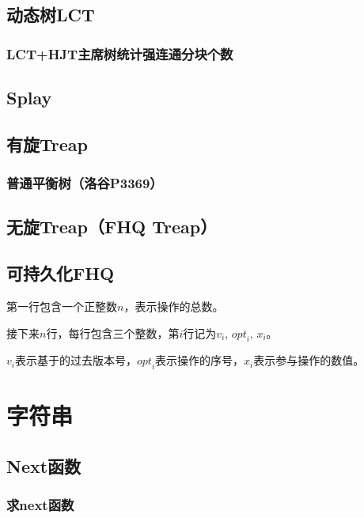 \documentclass{article}
\begin{document}
\subsection{动态树LCT}
\subsubsection{}
\subsubsection{LCT+HJT主席树统计强连通分块个数}



\subsection{Splay}
\subsection{有旋Treap}
\subsubsection{普通平衡树（洛谷P3369）}

\subsection{无旋Treap（FHQ Treap）}


\subsection{可持久化FHQ}
第一行包含一个正整数$n$，表示操作的总数。\par
接下来$n$行，每行包含三个整数，第$i$行记为${v}_{i}$, ${opt}_i$, $x_i$。\par
$v_i$表示基于的过去版本号，${opt}_i$表示操作的序号，$x_i$表示参与操作的数值。


\section{字符串}


\subsection{Next函数}
\subsubsection{求next函数}

\end{document}
